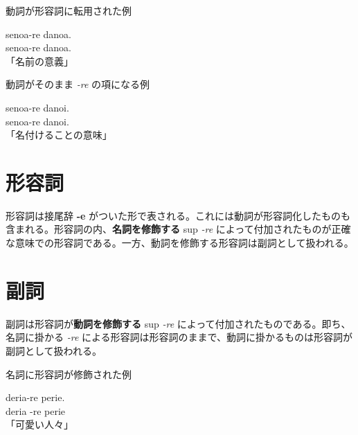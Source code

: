 \begin{itembox}[l]{動詞が形容詞に転用された例}
    \begin{pindent}
        \noindent
        senoa-re danoa. \\
        senoa-re danoa. \\
        「名前の意義」
    \end{pindent}
\end{itembox}

\begin{itembox}[l]{動詞がそのまま \emph{-re} の項になる例}
    \begin{pindent}
        senoa-re danoi. \\
        senoa-re danoi. \\
        「名付けることの意味」
        \noindent
    \end{pindent}
\end{itembox}

\section{形容詞}

形容詞は接尾辞 \textbf{-e} がついた形で表される。これには動詞が形容詞化したものも含まれる。形容詞の内、\textbf{名詞を修飾する} sup \emph{-re} によって付加されたものが正確な意味での形容詞である。一方、動詞を修飾する形容詞は副詞として扱われる。

\section{副詞}

副詞は形容詞が\textbf{動詞を修飾する} sup \emph{-re} によって付加されたものである。即ち、名詞に掛かる \emph{-re} による形容詞は形容詞のままで、動詞に掛かるものは形容詞が副詞として扱われる。

\begin{itembox}[l]{名詞に形容詞が修飾された例}
    \begin{pindent}
        \noindent
        deria-re perie. \vspace{-1mm} \\
        deria -re perie \vspace{-1mm} \\
        「可愛い人々」
    \end{pindent}
\end{itembox}

